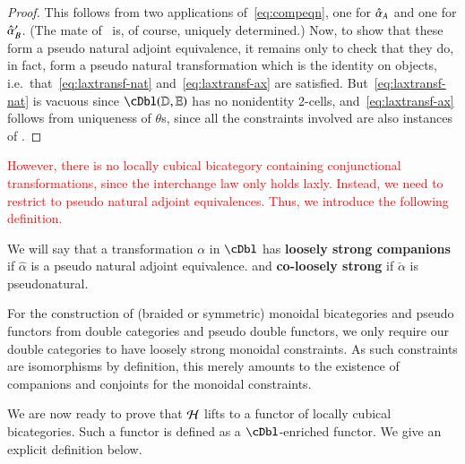 \begin{proof}
  This follows from two applications of~\eqref{eq:compeqn}, one for
  $\hat{\alpha}_A$ and one for $\hat{\alpha}_B'$.  (The mate of \th\ is, of
  course, uniquely determined.)  Now, to show that these form a pseudo
  natural adjoint equivalence, it remains only to check that they do,
  in fact, form a pseudo natural transformation which is the identity
  on objects, i.e.\ that~\eqref{eq:laxtransf-nat}
  and~\eqref{eq:laxtransf-ax} are satisfied.
  But~\eqref{eq:laxtransf-nat} is vacuous since $\cDbl(\lD,\lE)$ has
  no nonidentity 2-cells, and~\eqref{eq:laxtransf-ax} follows from uniqueness of $\theta$s,
  since all the constraints involved are also instances of \th.
\end{proof}

\textcolor{red}{
However, there is no locally cubical bicategory containing conjunctional transformations, since the interchange law only holds laxly.  Instead, we need to restrict to pseudo natural adjoint equivalences. Thus, we introduce the following definition.
}
\begin{defn}
  We will say that a transformation $\alpha$ in $\cDbl$ has \textbf{loosely strong companions} if $\hat\alpha$ is a pseudo natural adjoint equivalence.
   and \textbf{co-loosely strong} if $\check \alpha$ is pseudonatural.
   \end{defn}

For the construction of (braided or symmetric) monoidal bicategories and pseudo functors from double categories and pseudo double functors, we only require our double
categories to have loosely strong monoidal constraints. As such constraints are isomorphisms by definition, this merely amounts to the existence of companions and conjoints for the monoidal constraints.

We are now ready to prove that $\mathcal{H}$ lifts to a functor of locally cubical bicategories. Such a functor is defined as a $\cDbl$-enriched functor. We give an explicit definition below.

